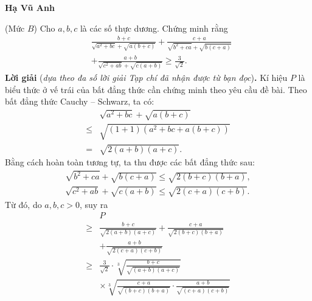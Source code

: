 \begin{multicols}{2}
	\begin{flushright}
		\textbf{\color{thachthuctoanhoc}Hạ Vũ Anh}
	\end{flushright}
	{}
	(Mức $B$) Cho $a, b, c$ là các số thực dương. Chứng minh rằng
	\begin{align*}
		&\frac{b+c}{\sqrt{\!a^2\!+\!b c}\!+\!\!\sqrt{\!a(b+c)}}\!+\!\frac{c\!+\!a}{\sqrt{\!b^2\!+\!c a}\!+\!\!\sqrt{\!b(c\!+\!a)}}\\
		&+\frac{a+b}{\sqrt{c^2+a b}+\sqrt{c(a+b)}} \geq \frac{3}{\sqrt{2}} .
	\end{align*}
	\textbf{\color{thachthuctoanhoc}Lời giải} (\textit{dựa theo đa số lời giải Tạp chí đã nhận được từ bạn đọc})\textbf{\color{thachthuctoanhoc}.}
	\vskip 0.05cm
	Kí hiệu $P$ là biểu thức ở vế trái của bất đẳng thức cần chứng minh theo yêu cầu đề bài.
	\vskip 0.05cm
	Theo bất đẳng thức Cauchy -- Schwarz, ta có:
	\begin{align*}
		&\sqrt {{a^2} + bc}  + \sqrt {a\left( {b + c} \right)}  \\
		\le &\sqrt {\left( {1 + 1} \right)\left( {{a^2} + bc + a\left( {b + c} \right)} \right)} \\
		 = &\sqrt {2\left( {a + b} \right)\left( {a + c} \right)} .
	\end{align*}
	Bằng cách hoàn toàn tương tự, ta thu được các bất đẳng thức sau:
	\begin{align*}
		\sqrt {{b^2} \!+\! ca}  \!+\! \sqrt {b\left( {c \!+\! a} \right)}  \le \sqrt {2\left( {b \!+\! c} \right)\left( {b \!+\! a} \right)} ,\\
		\sqrt {{c^2} \!+\! ab}  \!+\! \sqrt {c\left( {a \!+\! b} \right)}  \le \sqrt {2\left( {c \!+\! a} \right)\left( {c \!+\! b} \right)} .
	\end{align*}
	Từ đó, do $a, b, c > 0$, suy ra
	\begin{align*}
			&P \\
			\ge &\frac{{b + c}}{{\sqrt {2\left( {a + b} \right)\left( {a + c} \right)} }} + \frac{{c + a}}{{\sqrt {2\left( {b + c} \right)\left( {b + a} \right)} }}\\
			& + \frac{{a + b}}{{\sqrt {2\left( {c + a} \right)\left( {c + b} \right)} }}\\
			 \ge &\frac{3}{{\sqrt 2 }} \cdot \sqrt[3]{\frac{{b + c}}{{\sqrt {\left( {a + b} \right)\left( {a + c} \right)} }}}\\
			 &\times\sqrt[3]{\frac{{c + a}}{{\sqrt {\left( {b + c} \right)\left( {b + a} \right)} }}\cdot\frac{{a + b}}{{\sqrt {\left( {c + a} \right)\left( {c + b} \right)} }}}\\

\end{align*}
\end{multicols}
